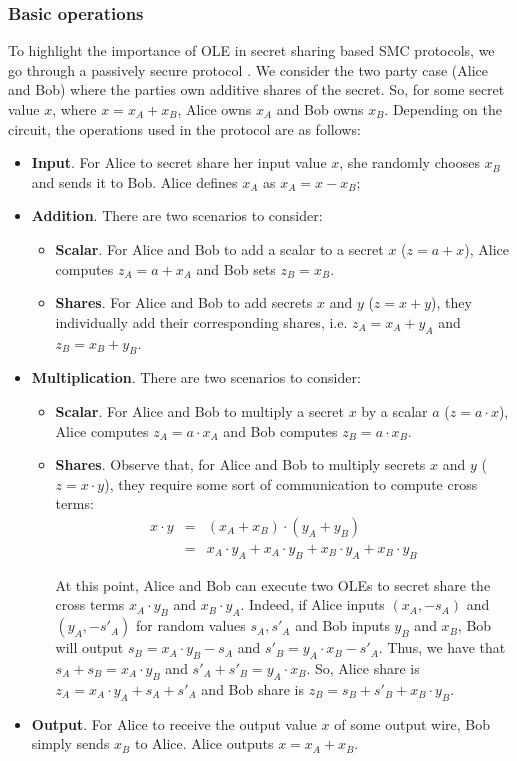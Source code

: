 \subsubsection{Basic operations}

To highlight the importance of OLE in secret sharing based SMC protocols, we go through a passively secure protocol \cite{Evans2018}. We consider the two party case (Alice and Bob) where the parties own additive shares of the secret. So, for some secret value $x$, where $x = x_A + x_B$, Alice owns $x_A$ and Bob owns $x_B$. Depending on the circuit, the operations used in the protocol are as follows:

\begin{itemize}
	\item \textbf{Input}. For Alice to secret share her input value $x$, she randomly chooses $x_B$ and sends it to Bob. Alice defines $x_A$ as $x_A = x - x_B$;
	\item \textbf{Addition}. There are two scenarios to consider:
	\begin{itemize}
		\item \textbf{Scalar}. For Alice and Bob to add a scalar to a secret $x$ ($z = a + x$), Alice computes $z_A = a + x_A$ and Bob sets $z_B = x_B$.
		\item \textbf{Shares}. For Alice and Bob to add secrets $x$ and $y$ ($z = x+y$), they individually add their corresponding shares, i.e. $z_A = x_A + y_A$ and $z_B = x_B + y_B$.
	\end{itemize}
	\item \textbf{Multiplication}. There are two scenarios to consider:
		\begin{itemize}
		\item \textbf{Scalar}. For Alice and Bob to multiply a secret $x$ by a scalar $a$ ($z = a \cdot x$), Alice computes $z_A = a \cdot x_A$ and Bob computes $z_B = a \cdot x_B$.
		\item \textbf{Shares}. Observe that, for Alice and Bob to multiply secrets $x$ and $y$ ($z = x\cdot y$), they require some sort of communication to compute cross terms:
		\begin{eqnarray}
		x\cdot y &=& (x_A + x_B)\cdot (y_A + y_B)\\
		&=& x_A\cdot y_A + x_A\cdot y_B + x_B \cdot y_A + x_B\cdot y_B
		\end{eqnarray}
		
		At this point, Alice and Bob can execute two OLEs to secret share the cross terms $x_A\cdot y_B$ and $x_B \cdot y_A$. Indeed, if Alice inputs $(x_A, - s_A)$ and $(y_A, - s'_A)$ for random values $s_A, s'_A$ and Bob inputs $y_B$ and $x_B$, Bob will output $s_B = x_A \cdot y_B - s_A$ and $s'_B = y_A \cdot x_B - s'_A$. Thus, we have that $s_A + s_B = x_A \cdot y_B$ and $s'_A + s'_B = y_A \cdot x_B$. So, Alice share is $z_A = x_A\cdot y_A + s_A + s'_A$ and Bob share is $z_B =  s_B + s'_B + x_B\cdot y_B$.  
	\end{itemize}
	\item \textbf{Output}. For Alice to receive the output value $x$ of some output wire, Bob simply sends $x_B$ to Alice. Alice outputs $x = x_A + x_B$.
\end{itemize}


